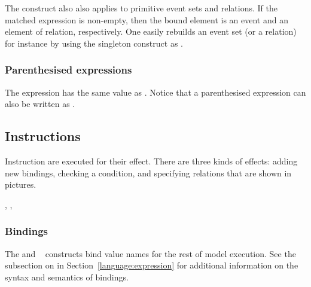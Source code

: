The construct also also applies to primitive event sets and relations.
If the matched expression is non-empty, then the bound element is an event
and an element of relation, respectively. One easily rebuilds an event set
(or a relation) for instance by using the singleton construct as
.

\subsubsection*{Parenthesised expressions}
The expression 
has the same value as .
Notice that a parenthesised expression
can also be written as  .

\subsection{\label{language:instruction}Instructions}
Instruction are executed for their  effect.
There are three kinds of effects: adding new bindings,
checking a condition, and specifying relations that are shown in pictures.
\begin{syntax}
 \is{}   \boption{}  \eoption {} \brepet{}   \erepet{}
\alt \boption {} \eoption {}  \boption {} \eoption
\alt {}  \T{=} \boption \T{||} 
\brepet \T{||}  \erepet
\alt {}   \T{=} \brepet {} \erepet {}
\alt {}    \boption {} \eoption
\alt {}   
\alt {}  \brepet \T{,}  \erepet
\alt {}  \brepet \T{,}  \erepet
\alt {}     \brepet{}  \erepet {}
\alt {}   
\alt {} 
\alt {}    \brepet {} \erepet \boption {} \brepet {} \erepet \eoption {}
\sep
{} \is {} \orelse \T{\textasciitilde} 
\sep
{} \is {} \orelse {} \orelse {}
\end{syntax}

\subsubsection*{Bindings}
The  and ~ constructs bind value names for the rest
of model execution.
See the subsection on 
in Section~\ref{language:expression}
for additional information on the syntax and semantics of bindings.


